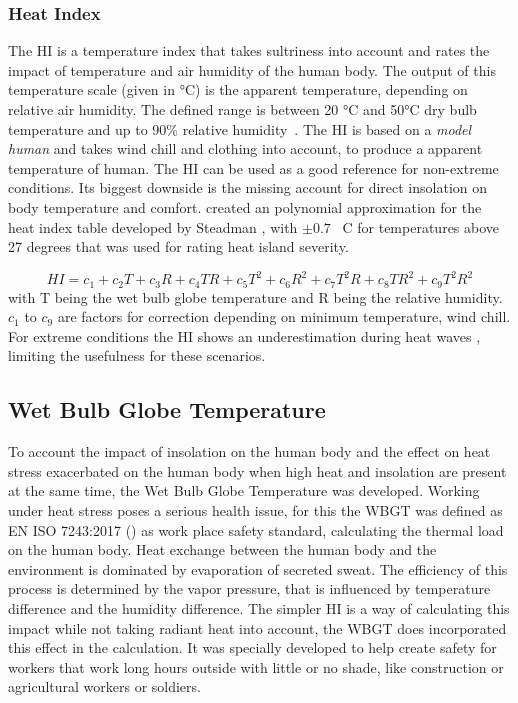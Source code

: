 \documentclass[12pt,a4paper, english,twoside]{scrartcl}
\begin{document}
    \subsubsection{Heat Index}\label{sec:heatIndex}
    The \gls{HI} is a temperature index that takes sultriness into account and rates the impact of temperature and air humidity of the human body. 
    The output of this temperature scale (given in °C) is the apparent temperature, depending on relative air humidity. 
    The defined range is between 20 °C and 50°C dry bulb temperature and up to 90\% relative humidity~\autocite[p. 862]{Steadman1979}. 
    The \gls{HI} is based on a \textit{model human} and takes wind chill and clothing into account, to produce a apparent temperature of human. 
    The \gls{HI} can be used as a good reference for non-extreme conditions. 
    Its biggest downside is the missing account for direct insolation on body temperature and comfort.
    \Cite{Schoen2005} created an polynomial approximation for the heat index table developed by Steadman \autocite{Steadman1979}, with $\pm 0.7$ \textdegree\ C for temperatures above 27 degrees that was used for rating heat island severity.

    \begin{equation}
      HI = c_1 + c_2 T + c_3 R + c_4 T R + c_5 T^2 + c_6 R^2 + c_7 T^2 R + c_8 T R^2 + c_9 T^2 R^2
    \end{equation}
    with T being the wet bulb globe temperature and R being the relative humidity. 
    $c_1$ to $c_9$ are factors for correction depending on minimum temperature, wind chill.
    For extreme conditions the \gls{HI} shows an underestimation during heat waves \autocite{Romps2022}, limiting the usefulness for these scenarios.
  \subsection{Wet Bulb Globe Temperature}
    To account the impact of insolation on the human body and the effect on heat stress exacerbated on the human body when high heat and insolation are present at the same time, the Wet Bulb Globe Temperature was developed. 
    Working under heat stress poses a serious health issue, for this the \gls{WBGT} was defined as EN ISO 7243:2017 (\cite{Iso7243_2017}) as work place safety standard, calculating the thermal load on the human body.
    Heat exchange between the human body and the environment is dominated by evaporation of secreted sweat.
    The efficiency of this process is determined by the vapor pressure, that is influenced by temperature difference and the humidity difference.
    The simpler \gls{HI} is a way of calculating this impact while not taking radiant heat into account, the WBGT does incorporated this effect in the calculation.
    It was specially developed to help create safety for workers that work long hours outside with little or no shade, like construction or agricultural workers or soldiers.
% 
  \newpage
\end{document}

